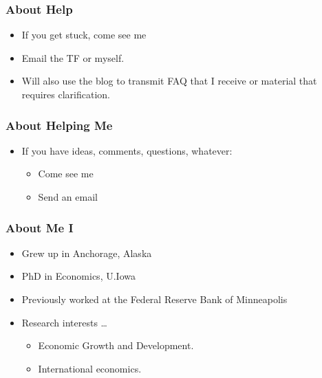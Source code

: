 \documentclass[9pt]{beamer}
\begin{document}
\begin{frame}[t]
\frametitle{About Help}
\begin{itemize}
\item If you get stuck, come see me
\bigskip
\item Email the TF or myself.
\bigskip
\item Will also use the blog to transmit FAQ that I receive or material that requires clarification.
\end{itemize}
\end{frame}



\begin{frame}[t]
\frametitle{About Helping Me}
\begin{itemize}
\item If you have ideas, comments, questions, whatever:
\begin{itemize}
\medskip
\item Come see me
\medskip
\item Send an email
\end{itemize}
\end{itemize}
\end{frame}


\begin{frame}[t]
\frametitle{About Me I}
\begin{itemize}
\item Grew up in Anchorage, Alaska
\bigskip
\item PhD in Economics, U.Iowa
\bigskip
\item Previously worked at the Federal Reserve Bank of Minneapolis
\bigskip
\item Research interests \ldots
\begin{itemize}
\medskip
\item Economic Growth and Development.
\medskip
\item International economics.
\medskip
\end{itemize}
\end{itemize}
\bigskip
\end{frame}
\end{document}

